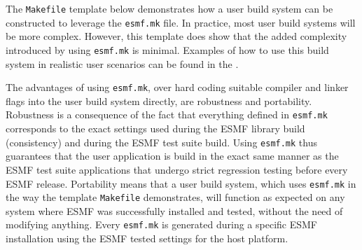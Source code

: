 The {\tt Makefile} template below demonstrates how a user build system can be 
constructed to leverage the {\tt esmf.mk} file. In practice, most user build 
systems will be more complex. However, this template does show that the added 
complexity introduced by using {\tt esmf.mk} is minimal. Examples of how to use 
this build system in realistic user scenarios can be found in the 
.

The advantages of using {\tt esmf.mk}, over hard coding suitable compiler and 
linker flags into the user build system directly, are robustness and portability. 
Robustness is a consequence of the fact that everything defined in {\tt esmf.mk} 
corresponds to the exact settings used during the ESMF library build 
(consistency) and during the ESMF test suite build. Using {\tt esmf.mk} thus 
guarantees that the user application is build in the exact same manner as the 
ESMF test suite applications that undergo strict regression testing before every 
ESMF release. Portability means that a user build system, which uses 
{\tt esmf.mk} in the way the template {\tt Makefile} demonstrates, will function 
as expected on any system where ESMF was successfully installed and tested, 
without the need of modifying anything. Every {\tt esmf.mk} is generated during 
a specific ESMF installation using the ESMF tested settings for the host 
platform.

